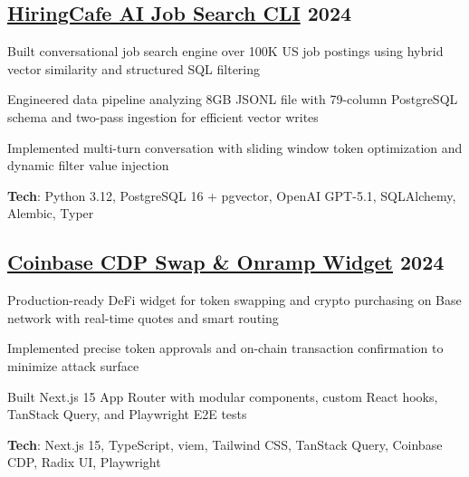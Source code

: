 \documentclass[letter,10pt]{article}
\begin{document}
\subsection{{ \href{https://github.com/Suhel-Kap/hiringcafe-dataset-job-search}{HiringCafe AI Job Search CLI} \hfill 2024}}
\begin{zitemize}
  \item Built conversational job search engine over 100K US job postings using hybrid vector similarity and structured SQL filtering
  \item Engineered data pipeline analyzing 8GB JSONL file with 79-column PostgreSQL schema and two-pass ingestion for efficient vector writes
  \item Implemented multi-turn conversation with sliding window token optimization and dynamic filter value injection
  \item \textbf{Tech}: Python 3.12, PostgreSQL 16 + pgvector, OpenAI GPT-5.1, SQLAlchemy, Alembic, Typer
\end{zitemize}

\subsection{{ \href{https://github.com/Suhel-Kap/coinbase-swap-widget}{Coinbase CDP Swap \& Onramp Widget} \hfill 2024}}
\begin{zitemize}
  \item Production-ready DeFi widget for token swapping and crypto purchasing on Base network with real-time quotes and smart routing
  \item Implemented precise token approvals and on-chain transaction confirmation to minimize attack surface
  \item Built Next.js 15 App Router with modular components, custom React hooks, TanStack Query, and Playwright E2E tests
  \item \textbf{Tech}: Next.js 15, TypeScript, viem, Tailwind CSS, TanStack Query, Coinbase CDP, Radix UI, Playwright
\end{zitemize}
\end{document}
